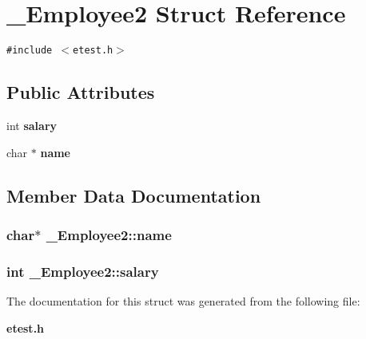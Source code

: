 \section{\_\-Employee2 Struct Reference}
\label{struct__Employee2}
{\tt \#include $<$etest.h$>$}

\subsection*{Public Attributes}
\begin{CompactItemize}
\item 
int \bf{salary}
\item 
char $\ast$ \bf{name}
\end{CompactItemize}


\subsection{Member Data Documentation}
\subsubsection{\setlength{\rightskip}{0pt plus 5cm}char$\ast$ \bf{\_\-Employee2::name}}\label{struct__Employee2_ee8701ef870506233cd25e98fdeccd68}


\subsubsection{\setlength{\rightskip}{0pt plus 5cm}int \bf{\_\-Employee2::salary}}\label{struct__Employee2_0022bb6b124c53dcb98f2ed728b32d12}




The documentation for this struct was generated from the following file:\begin{CompactItemize}
\item 
\bf{etest.h}\end{CompactItemize}
